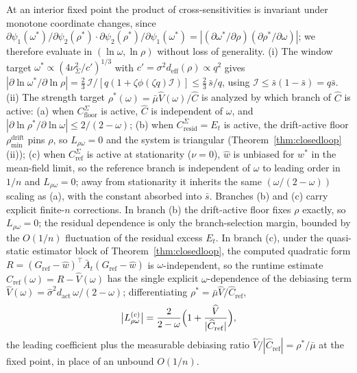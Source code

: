 At an interior fixed point the product of cross-sensitivities is invariant under monotone coordinate changes, since $\partial \psi_1(\omega^*)/\partial \psi_2(\rho^*)\cdot \partial \psi_2(\rho^*)/\partial \psi_1(\omega^*) = |(\partial \omega^*/\partial \rho)(\partial \rho^*/\partial \omega)|$; we therefore evaluate in $(\ln \omega, \ln \rho)$ without loss of generality.
(i) The window target $\omega^* \propto (4\nu^2_\Sigma / c')^{1/3}$ with $c' = \sigma^2 d_{\mathrm{eff}}(\rho) \propto q^2$ gives $|\partial \ln \omega^*/\partial \ln \rho| = \tfrac{2}{3}\,\mathcal I / [q(1 + \zeta\phi(\zeta q)\mathcal I)] \le \tfrac{2}{3}\,\bar s/q$, using $\mathcal I \le \bar s(1-\bar s) = q\bar s$.
(ii) The strength target $\rho^*(\omega) = \bar\mu\widehat V(\omega)/\widehat C$ is analyzed by which branch of $\widehat C$ is active:
(a) when $C^\Sigma_{\mathrm{floor}}$ is active, $\widehat C$ is independent of $\omega$, and $|\partial \ln \rho^*/\partial \ln \omega| \le 2/(2-\omega)$;
(b) when $C^\Sigma_{\mathrm{resid}} = E_t$ is active, the drift-active floor $\rho_{\min}^{\mathrm{drift}}$ pins $\rho$, so $L_{\rho\omega} = 0$ and the system is triangular (Theorem~\ref{thm:closedloop}(ii));
(c) when $C^\Sigma_{\mathrm{ref}}$ is active at stationarity ($\nu = 0$), $\widehat w$ is unbiased for $w^*$ in the mean-field limit, so the reference branch is independent of $\omega$ to leading order in $1/n$ and $L_{\rho\omega} = 0$; away from stationarity it inherits the same $(\omega/(2-\omega))$ scaling as (a), with the constant absorbed into $\bar s$.
Branches (b) and (c) carry explicit finite-$n$ corrections. In branch (b) the drift-active floor fixes $\rho$ exactly, so $L_{\rho\omega} = 0$; the residual dependence is only the branch-selection margin, bounded by the $O(1/n)$ fluctuation of the residual excess $E_t$.
In branch (c), under the quasi-static estimator block of Theorem~\ref{thm:closedloop}, the computed quadratic form $R = (G_{\mathrm{ref}}-\widehat w)^\top \bar A_t (G_{\mathrm{ref}}-\widehat w)$ is $\omega$-independent, so the runtime estimate $\widehat C_{\mathrm{ref}}(\omega) = R - \widehat V(\omega)$ has the single explicit $\omega$-dependence of the debiasing term $\widehat V(\omega) = \widehat\sigma^2 d_{\mathrm{act}}\,\omega/(2-\omega)$; differentiating $\rho^* = \bar\mu\widehat V/\widehat C_{\mathrm{ref}}$,
\[
\bigl|L_{\rho\omega}^{(c)}\bigr|
= \frac{2}{2-\omega}\Bigl(1 + \frac{\widehat V}{|\widehat C_{\mathrm{ref}}|}\Bigr),
\]
the leading coefficient plus the measurable debiasing ratio $\widehat V/|\widehat C_{\mathrm{ref}}| = \rho^*/\bar\mu$ at the fixed point, in place of an unbound $O(1/n)$.
